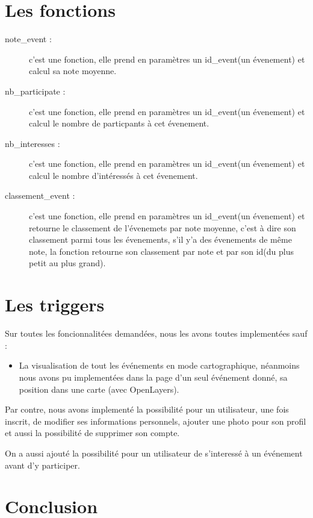 \documentclass[oneside,11pt,a4paper]{article}
\begin{document}
\section{Les fonctions}
\begin{description}
	
	\item[note\_event : ] c'est une fonction, elle prend en paramètres un id\_event(un évenement) et calcul sa note moyenne.
	
	\item[nb\_participate : ] c'est une fonction, elle prend en paramètres un id\_event(un évenement) et calcul le nombre de particpants à cet évenement.
	
	\item[nb\_interesses : ] c'est une fonction, elle prend en paramètres un id\_event(un évenement) et calcul le nombre d'intéressés à cet évenement.
	\item[classement\_event : ] c'est une fonction, elle prend en paramètres un id\_event(un évenement) et retourne le classement de l'évenemets par note moyenne, c'est à dire son classement parmi tous les évenements, s'il y'a des évenements de même note, la fonction retourne son classement par note et par son id(du plus petit au plus grand).
	
	
\end{description}
\section{Les triggers}

Sur toutes les foncionnalitées demandées, nous les avons toutes implementées sauf :

\begin{itemize}
  \item La visualisation de tout les événements en mode cartographique, néanmoins nous avons pu implementées dans la page d'un seul événement donné, sa position dans une carte (avec OpenLayers).
\end{itemize}

Par contre, nous avons implementé la possibilité pour un utilisateur, une fois inscrit, de modifier ses informations personnels, ajouter une photo pour son profil et aussi la possibilité de supprimer son compte.

On a aussi ajouté la possibilité pour un utilisateur de s'interessé à un événement avant d'y participer.


\section{Conclusion}
\end{document}
